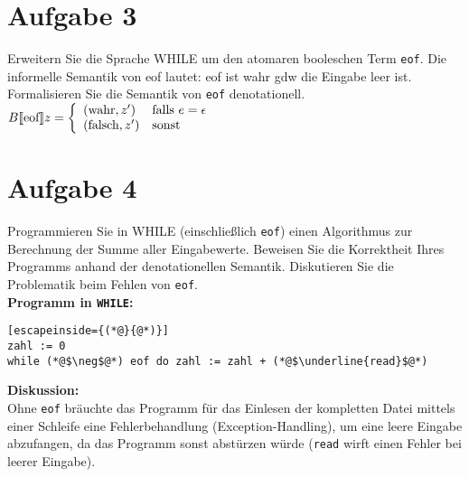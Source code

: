 \documentclass[ngerman,a4paper]{report}
\begin{document}
\section*{Aufgabe 3}
Erweitern Sie die Sprache WHILE um den atomaren booleschen Term \lstinline!eof!. Die informelle Semantik von eof lautet: eof ist wahr gdw die Eingabe leer ist.\\
Formalisieren Sie die Semantik von \lstinline!eof! denotationell.\\

%
%
%
$ B \llbracket\text{eof} \rrbracket z = \left\lbrace\begin{array}{l l}
(\text{wahr},z') & \text{falls } e = \epsilon\\
(\text{falsch},z') & \text{sonst}
\end{array}\right.$
\section*{Aufgabe 4}
Programmieren Sie in WHILE (einschließlich \lstinline!eof!) einen Algorithmus zur Berechnung der Summe aller Eingabewerte. Beweisen Sie die Korrektheit Ihres Programms anhand der denotationellen Semantik. Diskutieren Sie die Problematik beim Fehlen von \lstinline!eof!.\\
\textbf{Programm in \texttt{WHILE}:}\\
\begin{lstlisting}[escapeinside={(*@}{@*)}]
zahl := 0
while (*@$\neg$@*) eof do zahl := zahl + (*@$\underline{read}$@*)
\end{lstlisting}

\textbf{Diskussion:}\\
Ohne \lstinline$eof$ bräuchte das Programm für das Einlesen der kompletten Datei mittels einer Schleife eine Fehlerbehandlung (Exception-Handling), um eine leere Eingabe abzufangen, da das Programm sonst abstürzen würde (\lstinline$read$ wirft einen Fehler bei leerer Eingabe).
\end{document}
